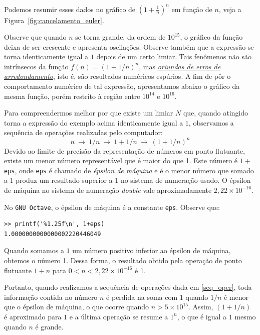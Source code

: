 \begin{ex}
Podemos resumir esses dados no gráfico de $\left(1+\frac{1}{n}\right)^n$ em função de $n$, veja a Figura~\ref{fig:cancelamento_euler}.

Observe que quando $n$ se torna grande, da ordem de $10^{15}$, o gráfico da função deixa de ser crescente e apresenta oscilações.  Observe também que a expressão se torna identicamente igual a $1$ depois de um certo limiar. Tais fenômenos não são intrínsecos da função $f(n)=(1+1/n)^n$, mas \emph{\uline{oriundas de erros de arredondamento}}, isto é, são resultados numéricos espúrios. A fim de pôr o comportamento numérico de tal expressão, apresentamos abaixo o gráfico da mesma função, porém restrito à região entre $10^{14}$ e $10^{16}$.

Para compreendermos melhor por que existe um limiar $N$ que, quando atingido torna a expressão do exemplo acima identicamente igual a $1$, observamos a sequência de operações realizadas pelo computador:
\begin{equation}\label{seq_oper}
n~\to ~1/n ~\to ~1+1/n ~\to ~(1+1/n)^n
\end{equation}
Devido ao limite de precisão da representação de números em ponto flutuante, existe um menor número representável que é maior do que 1. Este número é $1 + $\verb+eps+, onde \verb+eps+ é chamado de \emph{épsilon de máquina} e é o menor número que somado a 1 produz um resultado superior a 1 no sistema de numeração usado. O épsilon de máquina no sistema de numeração \emph{double} vale aproximadamente $2,22\times 10^{-16}$.

No \verb+GNU Octave+, o épsilon de máquina é a constante \verb+eps+. Observe que:
\begin{verbatim}
>> printf('%1.25f\n', 1+eps)
1.0000000000000002220446049
\end{verbatim}

Quando somamos a $1$ um número positivo inferior ao épsilon de máquina, obtemos o número 1. Dessa forma, o resultado obtido pela operação de ponto flutuante $1+n$ para $0<n<2,22 \times 10^{-16}$ é 1.

Portanto, quando realizamos a sequência de operações dada em \eqref{seq_oper}, toda informação contida no número $n$ é perdida na soma com $1$ quando $1/n$ é menor que o épsilon de máquina, o que ocorre quando $n>5\times 10^{15}$. Assim, $(1+1/n)$ é aproximado para $1$ e a última operação se resume a $1^n$, o que é igual a $1$ mesmo quando $n$ é grande.


\end{ex}

